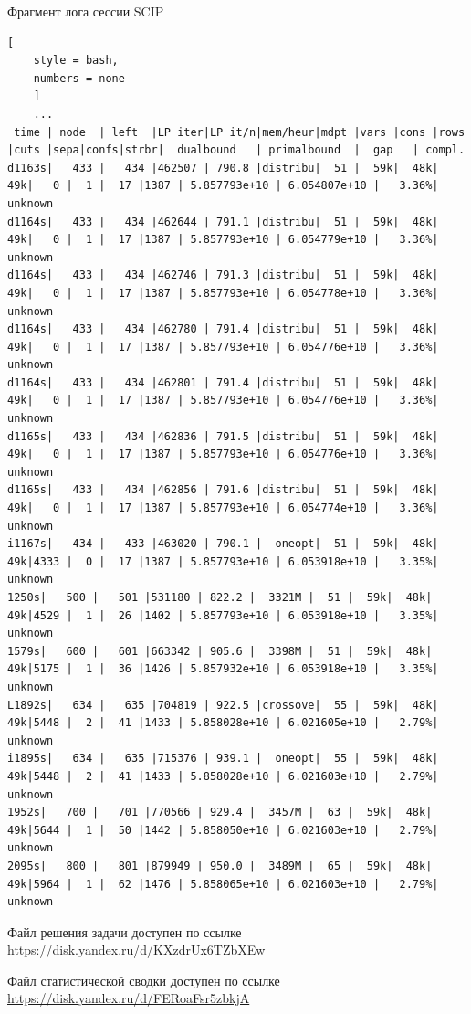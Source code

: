 \documentclass[%
	11pt,
	a4paper,
	utf8,
		]{article}
\begin{document}
Фрагмент лога сессии SCIP
\begin{lstlisting}[
	style = bash,
	numbers = none
	]
	...
 time | node  | left  |LP iter|LP it/n|mem/heur|mdpt |vars |cons |rows |cuts |sepa|confs|strbr|  dualbound   | primalbound  |  gap   | compl. 
d1163s|   433 |   434 |462507 | 790.8 |distribu|  51 |  59k|  48k|  49k|   0 |  1 |  17 |1387 | 5.857793e+10 | 6.054807e+10 |   3.36%| unknown
d1164s|   433 |   434 |462644 | 791.1 |distribu|  51 |  59k|  48k|  49k|   0 |  1 |  17 |1387 | 5.857793e+10 | 6.054779e+10 |   3.36%| unknown
d1164s|   433 |   434 |462746 | 791.3 |distribu|  51 |  59k|  48k|  49k|   0 |  1 |  17 |1387 | 5.857793e+10 | 6.054778e+10 |   3.36%| unknown
d1164s|   433 |   434 |462780 | 791.4 |distribu|  51 |  59k|  48k|  49k|   0 |  1 |  17 |1387 | 5.857793e+10 | 6.054776e+10 |   3.36%| unknown
d1164s|   433 |   434 |462801 | 791.4 |distribu|  51 |  59k|  48k|  49k|   0 |  1 |  17 |1387 | 5.857793e+10 | 6.054776e+10 |   3.36%| unknown
d1165s|   433 |   434 |462836 | 791.5 |distribu|  51 |  59k|  48k|  49k|   0 |  1 |  17 |1387 | 5.857793e+10 | 6.054776e+10 |   3.36%| unknown
d1165s|   433 |   434 |462856 | 791.6 |distribu|  51 |  59k|  48k|  49k|   0 |  1 |  17 |1387 | 5.857793e+10 | 6.054774e+10 |   3.36%| unknown
i1167s|   434 |   433 |463020 | 790.1 |  oneopt|  51 |  59k|  48k|  49k|4333 |  0 |  17 |1387 | 5.857793e+10 | 6.053918e+10 |   3.35%| unknown
1250s|   500 |   501 |531180 | 822.2 |  3321M |  51 |  59k|  48k|  49k|4529 |  1 |  26 |1402 | 5.857793e+10 | 6.053918e+10 |   3.35%| unknown
1579s|   600 |   601 |663342 | 905.6 |  3398M |  51 |  59k|  48k|  49k|5175 |  1 |  36 |1426 | 5.857932e+10 | 6.053918e+10 |   3.35%| unknown
L1892s|   634 |   635 |704819 | 922.5 |crossove|  55 |  59k|  48k|  49k|5448 |  2 |  41 |1433 | 5.858028e+10 | 6.021605e+10 |   2.79%| unknown
i1895s|   634 |   635 |715376 | 939.1 |  oneopt|  55 |  59k|  48k|  49k|5448 |  2 |  41 |1433 | 5.858028e+10 | 6.021603e+10 |   2.79%| unknown
1952s|   700 |   701 |770566 | 929.4 |  3457M |  63 |  59k|  48k|  49k|5644 |  1 |  50 |1442 | 5.858050e+10 | 6.021603e+10 |   2.79%| unknown
2095s|   800 |   801 |879949 | 950.0 |  3489M |  65 |  59k|  48k|  49k|5964 |  1 |  62 |1476 | 5.858065e+10 | 6.021603e+10 |   2.79%| unknown
\end{lstlisting}

Файл решения задачи доступен по ссылке \url{https://disk.yandex.ru/d/KXzdrUx6TZbXEw}

Файл статистической сводки доступен по ссылке \url{https://disk.yandex.ru/d/FERoaFsr5zbkjA}
\end{document}
